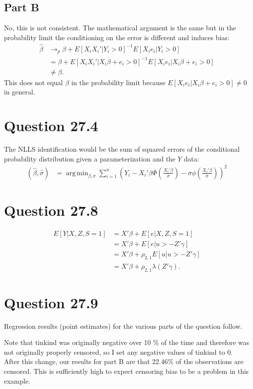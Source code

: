 \documentclass[11pt]{article} %
\DeclareMathOperator*{\argmin}{arg\,min}
\begin{document}
\subsection{Part B}
No, this is not consistent. The mathematical argument is the same but in the probability limit the conditioning on the error is different and induces bias:
\begin{align*}
\hat{\beta} &\rightarrow_p \beta + E[X_iX_i'|Y_{i}>0]^{-1}E[X_ie_i|Y_{i}>0]\\
&= \beta +  E[X_iX_i'|X_{i}\beta +e_i>0]^{-1}E[X_ie_i|X_{i}\beta +e_i>0] \\
& \neq \beta.
\end{align*}
This does not equal $\beta$ in the probability limit because $E[X_ie_i|X_{i}\beta +e_i>0] \neq 0$ in general.
\section{Question 27.4}
The NLLS identification would be the sum of squared errors of the conditional probability distribution given a parameterization and the $Y$ data:
\begin{align*}
(\hat{\beta},\hat{\sigma}) &= \argmin_{\beta,\sigma} \sum_{i=1}^n \left(Y_i -X_i'\beta \Phi\left( \frac{X_i'\beta}{\sigma} \right) - \sigma \phi\left( \frac{X_i'\beta}{\sigma} \right) \right)^2
\end{align*}
\section{Question 27.8}
\begin{align*}
E[Y|X,Z,S=1] &= X'\beta + E[e|X,Z,S=1] \\
&= X'\beta + E[e|u>-Z'\gamma] \\
&= X'\beta + \rho_{2,1} E[u|u>-Z'\gamma]\\
&=X'\beta + \rho_{2,1}\lambda(Z'\gamma).
\end{align*}
\section{Question 27.9}
Regression results (point estimates) for the various parts of the question follow.

\begin{center}

\end{center}

Note that tinkind was originally negative over 10 \% of the time and therefore was not originally properly censored,  so I set any negative values of tinkind to 0. After this change, our results for part B are that 22.46\% of the observations are censored.  This is sufficiently high to expect censoring bias to be a problem in this example.
\end{document}

